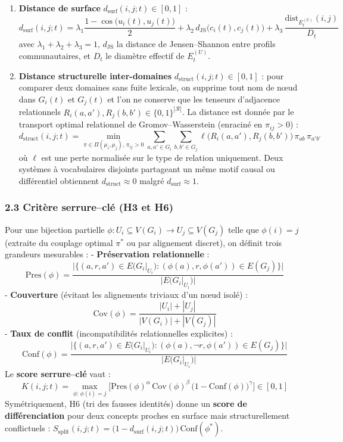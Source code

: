 \documentclass[a4paper,11pt]{article}
\providecommand{\tightlist}{\setlength{\itemsep}{0pt}\setlength{\parskip}{0pt}}
\begin{document}
\begin{enumerate}
\def\labelenumi{\arabic{enumi}.}
\tightlist
\item
  \textbf{Distance de surface} \(d_{\mathrm{surf}}(i,j;t) \in [0,1]\) :
  \[d_{\mathrm{surf}}(i,j;t) = \lambda_1 \frac{1 - \cos\!\big(u_i(t), u_j(t)\big)}{2} + \lambda_2 \, d_{\mathrm{JS}}\!\big(c_i(t), c_j(t)\big) + \lambda_3 \, \frac{\mathrm{dist}_{E_t^{(U)}}(i,j)}{D_t}\]
  avec \(\lambda_1+\lambda_2+\lambda_3 = 1\), \(d_{\mathrm{JS}}\) la
  distance de Jensen--Shannon entre profils communautaires, et \(D_t\)
  le diamètre effectif de \(E_t^{(U)}\).
\item
  \textbf{Distance structurelle inter-domaines}
  \(d_{\mathrm{struct}}(i,j;t) \in [0,1]\) : pour comparer deux domaines
  sans fuite lexicale, on supprime tout nom de nœud dans \(G_i(t)\) et
  \(G_j(t)\) et l'on ne conserve que les tenseurs d'adjacence
  relationnels \(R_i(a,a'), R_j(b,b') \in \{0,1\}^{|\mathcal{R}|}\). La
  distance est donnée par le transport optimal relationnel de
  Gromov--Wasserstein (enraciné en \(\pi_{ij}>0\)) :
  \[d_{\mathrm{struct}}(i,j;t) = \min_{\pi \in \Pi(\mu_i,\mu_j),\, \pi_{ij} > 0} \sum_{a,a' \in G_i} \sum_{b,b' \in G_j} \ell\!\big(R_i(a,a'), R_j(b,b')\big)\, \pi_{ab}\,\pi_{a'b'}\]
  où \(\ell\) est une perte normalisée sur le type de relation
  uniquement. Deux systèmes à vocabulaires disjoints partageant un même
  motif causal ou différentiel obtiennent
  \(d_{\mathrm{struct}} \approx 0\) malgré
  \(d_{\mathrm{surf}} \approx 1\).
\end{enumerate}

\subsubsection*{2.3 Critère serrure--clé (H3 et H6)}

Pour une bijection partielle
\(\phi : U_i \subseteq V(G_i) \to U_j \subseteq V(G_j)\) telle que
\(\phi(i)=j\) (extraite du couplage optimal \(\pi^*\) ou par alignement
discret), on définit trois grandeurs mesurables : - \textbf{Préservation
relationnelle} :
\[\mathrm{Pres}(\phi) = \frac{|\{(a,r,a') \in E(G_i|_{U_i}) : (\phi(a), r, \phi(a')) \in E(G_j)\}|}{|E(G_i|_{U_i})|}\]
- \textbf{Couverture} (évitant les alignements triviaux d'un nœud isolé)
: \[\mathrm{Cov}(\phi) = \frac{|U_i| + |U_j|}{|V(G_i)| + |V(G_j)|}\] -
\textbf{Taux de conflit} (incompatibilités relationnelles explicites) :
\[\mathrm{Conf}(\phi) = \frac{|\{(a,r,a') \in E(G_i|_{U_i}) : (\phi(a), \neg r, \phi(a')) \in E(G_j)\}|}{|E(G_i|_{U_i})|}\]
Le \textbf{score serrure--clé} vaut :
\[K(i,j;t) = \max_{\phi:\,\phi(i)=j} \Big[\mathrm{Pres}(\phi)^{\alpha}\,\mathrm{Cov}(\phi)^{\beta}\,\big(1 - \mathrm{Conf}(\phi)\big)^{\gamma}\Big] \in [0,1]\]
Symétriquement, H6 (tri des fausses identités) donne un \textbf{score de
différenciation} pour deux concepts proches en surface mais
structurellement conflictuels :
\(S_{\mathrm{split}}(i,j;t) = \big(1 - d_{\mathrm{surf}}(i,j;t)\big)\,\mathrm{Conf}(\phi^*)\).
\end{document}
